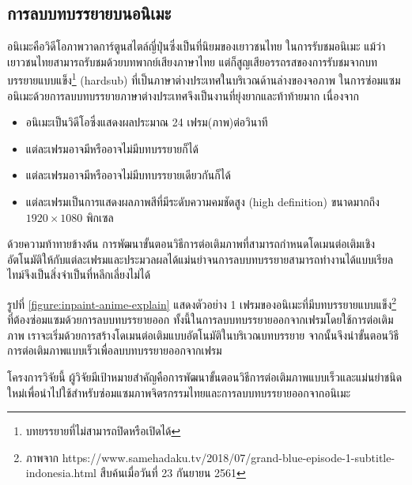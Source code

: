 

\subsection{การลบบทบรรยายบนอนิเมะ}
\hspace{1cm}อนิเมะคือวิดีโอภาพวาดการ์ตูนสไตล์ญี่ปุ่นซึ่งเป็นที่นิยมของเยาวชนไทย ในการรับชมอนิเมะ แม้ว่าเยาวชนไทยสามารถรับชมด้วยบทพากย์เสียงภาษาไทย แต่ก็สูญเสียอรรถรสของการรับชมจากบทบรรยายแบบแข็ง\footnote{บทยรรยายที่ไม่สามารถปิดหรือเปิดได้} (hardsub) ที่เป็นภาษาต่างประเทศในบริเวณด้านล่างของจอภาพ ในการซ่อมแซม\\อนิเมะด้วยการลบบทบรรยายภาษาต่างประเทศจึงเป็นงานที่ยุ่งยากและท้าท้ายมาก เนื่องจาก
\begin{itemize}
	\item [(1)] อนิเมะเป็นวิดีโอซึ่งแสดงผลประมาณ 24 เฟรม(ภาพ)ต่อวินาที
	\item [(2)] แต่ละเฟรมอาจมีหรืออาจไม่มีบทบรรยายก็ได้
	\item [(3)] แต่ละเฟรมอาจมีหรืออาจไม่มีบทบรรยายเดียวกันก็ได้
	\item [(4)] แต่ละเฟรมเป็นการแสดงผลภาพสีที่มีระดับความคมชัดสูง (high definition) ขนาดมากถึง $1920\times1080$ พิกเซล
\end{itemize}
ด้วยความท้าทายข้างต้น การพัฒนาขั้นตอนวิธีการต่อเติมภาพที่สามารถกำหนดโดเมนต่อเติมเชิงอัตโนมัติให้กับแต่ละเฟรมและประมวลผลได้แม่นยำจนการลบบทบรรยายสามารถทำงานได้แบบเรียลไทม์จึงเป็นสิ่งจำเป็นที่หลีกเลี่ยงไม่ได้
	
\hspace{1cm} รูปที่ \ref{figure:inpaint-anime-explain} แสดงตัวอย่าง 1 เฟรมของอนิเมะที่มีบทบรรยายแบบแข็ง\footnote{ภาพจาก https://www.samehadaku.tv/2018/07/grand-blue-episode-1-subtitle-indonesia.html สืบค้นเมื่อวันที่ 23 กันยายน 2561} ที่ต้องซ่อมแซมด้วยการลบบทบรรยายออก  ทั้งนี้ในการลบบทบรรยายออกจากเฟรมโดยใช้การต่อเติมภาพ เราจะเริ่มด้วยการสร้างโดเมนต่อเติมแบบอัตโนมัติในบริเวณบทบรรยาย จากนั้นจึงนำขั้นตอนวิธีการต่อเติมภาพแบบเร็วเพื่อลบบทบรรยายออกจากเฟรม 


	
\hspace{1cm} โครงการวิจัยนี้ ผู้วิจัยมีเป้าหมายสำคัญคือการพัฒนาขั้นตอนวิธีการต่อเติมภาพแบบเร็วและแม่นยำชนิดใหม่เพื่อนำไปใช้สำหรับซ่อมแซมภาพจิตรกรรมไทยและการลบบทบรรยายออกจากอนิเมะ